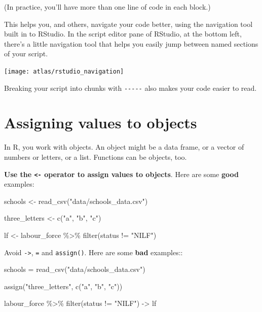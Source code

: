 \documentclass[
]{book}
\newenvironment{Shaded}{\begin{snugshade}}{\end{snugshade}}
\newcommand{\FunctionTok}[1]{\textcolor[rgb]{0.00,0.00,0.00}{#1}}
\newcommand{\NormalTok}[1]{#1}
\newcommand{\OtherTok}[1]{\textcolor[rgb]{0.56,0.35,0.01}{#1}}
\newcommand{\SpecialCharTok}[1]{\textcolor[rgb]{0.00,0.00,0.00}{#1}}
\newcommand{\StringTok}[1]{\textcolor[rgb]{0.31,0.60,0.02}{#1}}
\begin{document}
(In practice, you'll have more than one line of code in each block.)

This helps you, and others, navigate your code better, using the navigation tool built in to RStudio. In the script editor pane of RStudio, at the bottom left, there's a little navigation tool that helps you easily jump between named sections of your script.

\texttt{[image: atlas/rstudio\_navigation]}

Breaking your script into chunks with \texttt{-\/-\/-\/-\/-} also makes your code easier to read.

\hypertarget{assigning-values-to-objects}{%
\section{Assigning values to objects}\label{assigning-values-to-objects}}

In R, you work with objects. An object might be a data frame, or a vector of numbers or letters, or a list. Functions can be objects, too.

\textbf{Use the \texttt{\textless{}-} operator to assign values to objects}. Here are some \textbf{good} examples:

\begin{Shaded}
\begin{Highlighting}[]
\NormalTok{schools }\OtherTok{\textless{}{-}} \FunctionTok{read\_csv}\NormalTok{(}\StringTok{"data/schools\_data.csv"}\NormalTok{)}

\NormalTok{three\_letters }\OtherTok{\textless{}{-}} \FunctionTok{c}\NormalTok{(}\StringTok{"a"}\NormalTok{, }\StringTok{"b"}\NormalTok{, }\StringTok{"c"}\NormalTok{)}

\NormalTok{lf }\OtherTok{\textless{}{-}}\NormalTok{ labour\_force }\SpecialCharTok{\%\textgreater{}\%}
  \FunctionTok{filter}\NormalTok{(status }\SpecialCharTok{!=} \StringTok{"NILF"}\NormalTok{)}
\end{Highlighting}
\end{Shaded}

Avoid \texttt{-\textgreater{}}, \texttt{=} and \texttt{assign()}. Here are some \textbf{bad} examples::

\begin{Shaded}
\begin{Highlighting}[]
\NormalTok{schools }\OtherTok{=} \FunctionTok{read\_csv}\NormalTok{(}\StringTok{"data/schools\_data.csv"}\NormalTok{)}

\FunctionTok{assign}\NormalTok{(}\StringTok{"three\_letters"}\NormalTok{, }\FunctionTok{c}\NormalTok{(}\StringTok{"a"}\NormalTok{, }\StringTok{"b"}\NormalTok{, }\StringTok{"c"}\NormalTok{))}

\NormalTok{labour\_force }\SpecialCharTok{\%\textgreater{}\%}
  \FunctionTok{filter}\NormalTok{(status }\SpecialCharTok{!=} \StringTok{"NILF"}\NormalTok{) }\OtherTok{{-}\textgreater{}}\NormalTok{ lf}
\end{Highlighting}
\end{Shaded}
\end{document}
